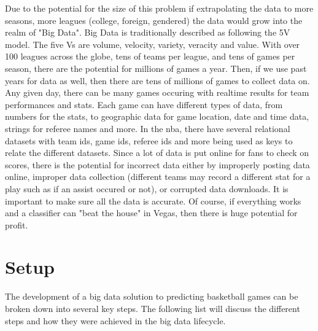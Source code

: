 \documentclass[12pt]{article}%
\begin{document}
\newline\newline
Due to the potential for the size of this problem if extrapolating the data to more seasons, more leagues (college, foreign, gendered) the data would grow into the realm of "Big Data". Big Data is traditionally described as following the 5V model. The five Vs are volume, velocity, variety, veracity and value.
\newline\newline
With over 100 leagues across the globe, tens of teams per league, and tens of games per season, there are the potential for millions of games a year. Then, if we use past years for data as well, then there are tens of millions of games to collect data on. Any given day, there can be many games occuring with realtime results for team performances and stats. Each game can have different types of data, from numbers for the stats, to geographic data for game location, date and time data, strings for referee names and more. In the nba, there have several relational datasets with team ids, game ids, referee ids and more being used as keys to relate the different datasets. Since a lot of data is put online for fans to check on scores, there is the potential for incorrect data either by improperly posting data online, improper data collection (different teams may record a different stat for a play such as if an assist occured or not), or corrupted data downloads. It is important to make sure all the data is accurate. Of course, if everything works and a classifier can "beat the house" in Vegas, then there is huge potential for profit.


\section{Setup}
The development of a big data solution to predicting basketball games can be broken down into several key steps. The following list will discuss the different steps and how they were achieved in the big data lifecycle.
\end{document}
